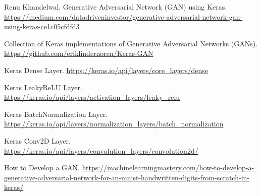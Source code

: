 \begin{thebibliography}{9}
 Renu Khandelwal. Generative Adversarial Network (GAN) using Keras.
\href{https://medium.com/datadriveninvestor/generative-adversarial-network-gan-using-keras-ce1c05cfdfd3}{https://medium.com/datadriveninvestor/generative-adversarial-network-gan-using-keras-ce1c05cfdfd3}

 Collection of Keras implementations of Generative Adversarial Networks (GANs).
\href{https://github.com/eriklindernoren/Keras-GAN}{https://github.com/eriklindernoren/Keras-GAN}

 Keras Dense Layer.
\href{https://keras.io/api/layers/core\_layers/dense}{https://keras.io/api/layers/core\_layers/dense}

 Keras LeakyReLU Layer.
\href{https://keras.io/api/layers/activation\_layers/leaky\_relu}{https://keras.io/api/layers/activation\_layers/leaky\_relu}

 Keras BatchNormalization Layer.
\href{https://keras.io/api/layers/normalization\_layers/batch\_normalization}{https://keras.io/api/layers/normalization\_layers/batch\_normalization}

 Keras Conv2D Layer.
\href{https://keras.io/api/layers/convolution\_layers/convolution2d/}{https://keras.io/api/layers/convolution\_layers/convolution2d/}

 How to Develop a GAN. 
\href{https://machinelearningmastery.com/how-to-develop-a-generative-adversarial-network-for-an-mnist-handwritten-digits-from-scratch-in-keras/}{https://machinelearningmastery.com/how-to-develop-a-generative-adversarial-network-for-an-mnist-handwritten-digits-from-scratch-in-keras/}

\end{thebibliography}